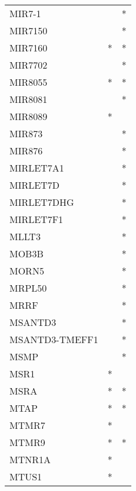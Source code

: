 \begin{longtable}{lcc}
MIR7-1                &                &          * \\
MIR7150               &                &          * \\
MIR7160               &              * &          * \\
MIR7702               &                &          * \\
MIR8055               &              * &          * \\
MIR8081               &                &          * \\
MIR8089               &              * &            \\
MIR873                &                &          * \\
MIR876                &                &          * \\
MIRLET7A1             &                &          * \\
MIRLET7D              &                &          * \\
MIRLET7DHG            &                &          * \\
MIRLET7F1             &                &          * \\
MLLT3                 &                &          * \\
MOB3B                 &                &          * \\
MORN5                 &                &          * \\
MRPL50                &                &          * \\
MRRF                  &                &          * \\
MSANTD3               &                &          * \\
MSANTD3-TMEFF1        &                &          * \\
MSMP                  &                &          * \\
MSR1                  &              * &            \\
MSRA                  &              * &          * \\
MTAP                  &              * &          * \\
MTMR7                 &              * &            \\
MTMR9                 &              * &          * \\
MTNR1A                &              * &            \\
MTUS1                 &              * &            \\

\end{longtable}
